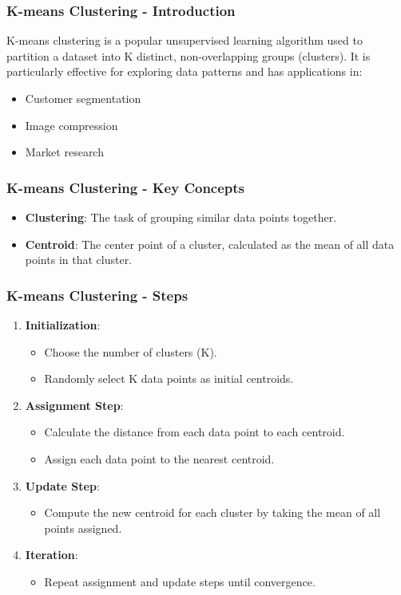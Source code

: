 \documentclass{beamer}
\begin{document}
\begin{frame}[fragile]
    \frametitle{K-means Clustering - Introduction}
    K-means clustering is a popular unsupervised learning algorithm used to partition a dataset into K distinct, non-overlapping groups (clusters). 
    It is particularly effective for exploring data patterns and has applications in:
    \begin{itemize}
        \item Customer segmentation
        \item Image compression
        \item Market research
    \end{itemize}
\end{frame}

\begin{frame}[fragile]
    \frametitle{K-means Clustering - Key Concepts}
    \begin{itemize}
        \item \textbf{Clustering}: The task of grouping similar data points together.
        \item \textbf{Centroid}: The center point of a cluster, calculated as the mean of all data points in that cluster.
    \end{itemize}
\end{frame}

\begin{frame}[fragile]
    \frametitle{K-means Clustering - Steps}
    \begin{enumerate}
        \item \textbf{Initialization}:
        \begin{itemize}
            \item Choose the number of clusters (K).
            \item Randomly select K data points as initial centroids.
        \end{itemize}
        
        \item \textbf{Assignment Step}:
        \begin{itemize}
            \item Calculate the distance from each data point to each centroid.
            \item Assign each data point to the nearest centroid.
        \end{itemize}
        
        \item \textbf{Update Step}:
        \begin{itemize}
            \item Compute the new centroid for each cluster by taking the mean of all points assigned.
        \end{itemize}
        
        \item \textbf{Iteration}:
        \begin{itemize}
            \item Repeat assignment and update steps until convergence.
        \end{itemize}
    \end{enumerate}
\end{frame}
\end{document}
